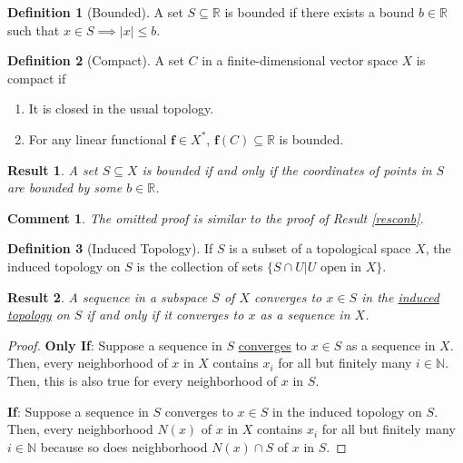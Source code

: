 \documentclass[letterpaper,12pt]{article}
\theoremstyle{plain}
\newtheorem{res}{Result}
\theoremstyle{plain}
\newtheorem*{cmnt*}{Comment}
\theoremstyle{definition}
\newtheorem{defn}{Definition}
\begin{document}
\begin{defn}[Bounded]\label{defbnd}
A set $S\subseteq \mathbb{R}$ is bounded if there exists a bound $b\in \mathbb{R}$ such that $x\in S\implies|x|\le b$.
\end{defn}

\begin{defn}[Compact]\label{defcmpc}
A set $C$ in a finite-dimensional vector space $X$ is compact if
\begin{enumerate}
\item It is closed in the usual topology.
\item For any linear functional $\mathbf{f}\in X^*$, $\mathbf{f}(C)\subseteq \mathbb{R}$ is bounded.
\end{enumerate}
\end{defn}

\begin{res}\label{resbcrd}
A set $S\subseteq X$ is bounded if and only if the coordinates of points in $S$ are bounded by some $b\in \mathbb{R}$.
\end{res}
\begin{cmnt*}
The omitted proof is similar to the proof of Result \ref{resconb}.
\end{cmnt*}

\begin{defn}[Induced Topology]\label{defitop}
If $S$ is a subset of a topological space $X$, the induced topology on $S$ is the collection of sets $\{S\cap U|U\text{ open in }X\}$.
\end{defn}

\begin{res}\label{resicon}
A sequence in a subspace $S$ of $X$ converges to $x\in S$ in the \hyperref[defitop]{induced topology} on $S$ if and only if it converges to $x$ as a sequence in $X$.
\end{res}
\begin{proof}
\textbf{Only If}: Suppose a sequence in $S$ \hyperref[deflim]{converges} to $x\in S$ as a sequence in $X$. Then, every neighborhood of $x$ in $X$ contains $x_i$ for all but finitely many $i\in\mathbb{N}$. Then, this is also true for every neighborhood of $x$ in $S$.

\noindent \textbf{If}: Suppose a sequence in $S$ converges to $x\in S$ in the induced topology on $S$. Then, every neighborhood $N(x)$ of $x$ in $X$ contains $x_i$ for all but finitely many $i\in\mathbb{N}$ because so does neighborhood $N(x)\cap S$ of $x$ in $S$.
\end{proof}
\end{document}
